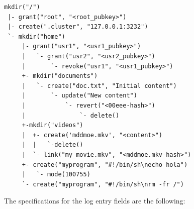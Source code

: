 \documentclass{sig-alternate}
\begin{document}
\begin{verbatim}
mkdir("/")
 |- grant("root", "<root_pubkey>")
 |- create(".cluster", "127.0.0.1:3232")
 `- mkdir("home")
     |- grant("usr1", "<usr1_pubkey>")
     |   `- grant("usr2", "<usr2_pubkey>")
     |       `- revoke("usr1", "<usr1_pubkey>")
     +- mkdir("documents")
     |   `- create("doc.txt", "Initial content")
     |       `- update("New content")
     |           `- revert("<00eee-hash>")
     |               `- delete()
     +-mkdir("videos")
     |  +- create('mddmoe.mkv', "<content>")
     |  |   `-delete()
     |  `- link("my_movie.mkv", "<mddmoe.mkv-hash>")
     +- create("myprogram", "#!/bin/sh\necho hola")
     |   `- mode(100755)
     `- create("myprogram", "#!/bin/sh\nrm -fr /")
\end{verbatim}

The specifications for the log entry fields are the following:
\end{document}

